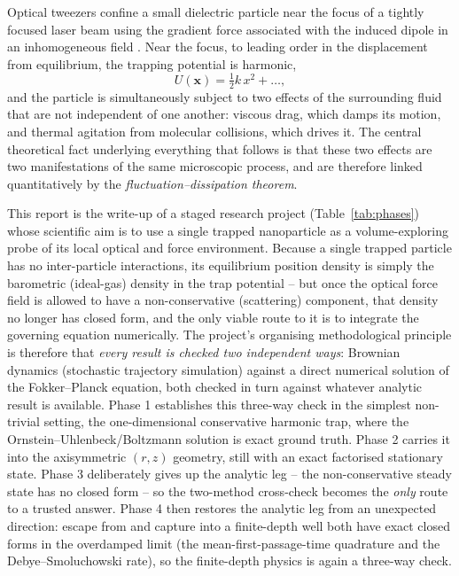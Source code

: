 \documentclass[11pt]{article}
\begin{document}
Optical tweezers confine a small dielectric particle near the focus of a tightly focused laser beam using the gradient force associated with the induced dipole in an inhomogeneous field \cite{JonesMaragoVolpe2015}. Near the focus, to leading order in the displacement from equilibrium, the trapping potential is harmonic,
\begin{equation}
U(\mathbf{x}) = \tfrac{1}{2}k\,x^2 + \dots,
\label{eq:harmonic-potential}
\end{equation}
and the particle is simultaneously subject to two effects of the surrounding fluid that are not independent of one another: viscous drag, which damps its motion, and thermal agitation from molecular collisions, which drives it. The central theoretical fact underlying everything that follows is that these two effects are two manifestations of the same microscopic process, and are therefore linked quantitatively by the \emph{fluctuation--dissipation theorem}.

This report is the write-up of a staged research project (Table~\ref{tab:phases}) whose scientific aim is to use a single trapped nanoparticle as a volume-exploring probe of its local optical and force environment. Because a single trapped particle has no inter-particle interactions, its equilibrium position density is simply the barometric (ideal-gas) density in the trap potential -- but once the optical force field is allowed to have a non-conservative (scattering) component, that density no longer has closed form, and the only viable route to it is to integrate the governing equation numerically. The project's organising methodological principle is therefore that \emph{every result is checked two independent ways}: Brownian dynamics (stochastic trajectory simulation) against a direct numerical solution of the Fokker--Planck equation, both checked in turn against whatever analytic result is available. Phase 1 establishes this three-way check in the simplest non-trivial setting, the one-dimensional conservative harmonic trap, where the Ornstein--Uhlenbeck/Boltzmann solution is exact ground truth. Phase 2 carries it into the axisymmetric $(r,z)$ geometry, still with an exact factorised stationary state. Phase 3 deliberately gives up the analytic leg -- the non-conservative steady state has no closed form -- so the two-method cross-check becomes the \emph{only} route to a trusted answer. Phase 4 then restores the analytic leg from an unexpected direction: escape from and capture into a finite-depth well both have exact closed forms in the overdamped limit (the mean-first-passage-time quadrature and the Debye--Smoluchowski rate), so the finite-depth physics is again a three-way check.
\end{document}

